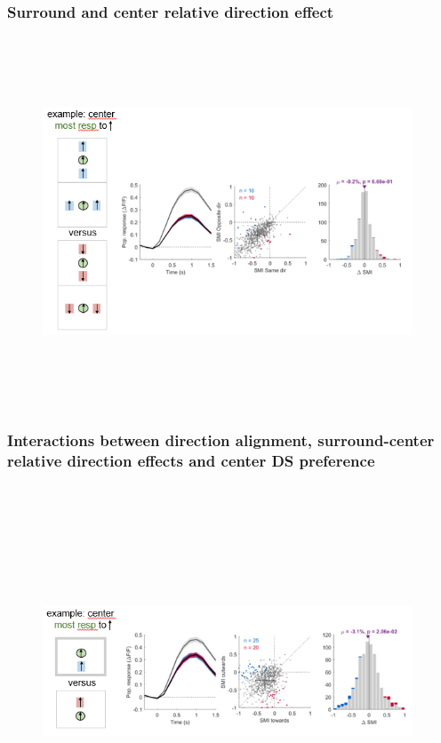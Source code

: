 \subsubsection{Surround and center relative direction effect}

\begin{figure}[H] \centering \includegraphics[width=11cm,height=11cm,keepaspectratio]{Figures/7.Results/finalPopulation/sel/diagrams/18.png} 
\end{figure}

\subsubsection{Interactions between direction alignment, surround-center relative direction effects and center DS preference}

\begin{figure}[H] \centering \includegraphics[width=11cm,height=11cm,keepaspectratio]{Figures/7.Results/finalPopulation/sel/diagrams/19.png} 
\end{figure}

